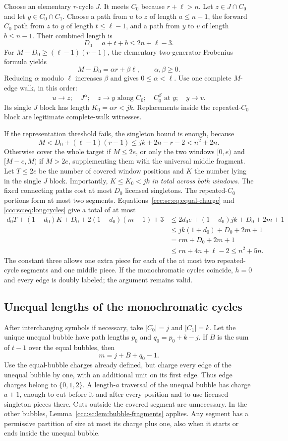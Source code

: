 \documentclass[11pt,letterpaper]{article}
\theoremstyle{definition}
\theoremstyle{remark}
\begin{document}
Choose an elementary $r$-cycle $J$. It meets $C_0$ because $r+\ell>n$. Let $z\in J\cap C_0$ and let $y\in C_0\cap C_1$. Choose a path from $u$ to $z$ of length $a\le n-1$, the forward $C_0$ path from $z$ to $y$ of length $t\le\ell-1$, and a path from $y$ to $v$ of length $b\le n-1$. Their combined length is
\[
 D_0=a+t+b\le2n+\ell-3.
\]
For $M-D_0\ge(\ell-1)(r-1)$, the elementary two-generator Frobenius formula yields
\[
 M-D_0=\alpha r+\beta\ell,\qquad \alpha,\beta\ge0.
\]
Reducing $\alpha$ modulo $\ell$ increases $\beta$ and gives $0\le\alpha<\ell$. Use one complete $M$-edge walk, in this order:
\[
 u\to z;\quad J^{\alpha};\quad z\to y\text{ along }C_0;
 \quad C_0^{\beta}\text{ at }y;\quad y\to v.
\]
Its single $J$ block has length $K_0=\alpha r<jk$. Replacements inside the repeated-$C_0$ block are legitimate complete-walk witnesses.

If the representation threshold fails, the singleton bound is enough, because
\[
 M<D_0+(\ell-1)(r-1)\le jk+2n-r-2<n^2+2n.
\]
Otherwise cover the whole target if $M\le2e$, or only the two windows $[0,e)$ and $[M-e,M)$ if $M>2e$, supplementing them with the universal middle fragment. Let $T\le2e$ be the number of covered window positions and $K$ the number lying in the single $J$ block. Importantly, $K\le K_0<jk$ \emph{in total across both windows}. The fixed connecting paths cost at most $D_0$ licensed singletons. The repeated-$C_0$ portions form at most two segments. Equations~\eqref{ccc:sc:eq:equal-charge} and \eqref{ccc:sc:eq:longcycles} give a total of at most
\begin{align*}
 d_0T+(1-d_0)K+D_0+2(1-d_0)(m-1)+3
 &\le 2d_0 e+(1-d_0)jk+D_0+2m+1\\
 &\le jk(1+d_0)+D_0+2m+1\\
 &=rm+D_0+2m+1\\
 &\le rn+4n+\ell-2\le n^2+5n.
\end{align*}
The constant three allows one extra piece for each of the at most two repeated-cycle segments and one middle piece. If the monochromatic cycles coincide, $h=0$ and every edge is doubly labeled; the argument remains valid.

\subsection{Unequal lengths of the monochromatic cycles}

After interchanging symbols if necessary, take $|C_0|=j$ and $|C_1|=k$. Let the unique unequal bubble have path lengths $p_0$ and $q_0=p_0+k-j$. If $B$ is the sum of $t-1$ over the equal bubbles, then
\[
 m=j+B+q_0-1.
\]
Use the equal-bubble charges already defined, but charge every edge of the unequal bubble by one, with an additional unit on its first edge. Thus edge charges belong to $\{0,1,2\}$. A length-$a$ traversal of the unequal bubble has charge $a+1$, enough to cut before it and after every position and to use licensed singleton pieces there. Cuts outside the covered segment are unnecessary. In the other bubbles, Lemma~\ref{ccc:sc:lem:bubble-fragments} applies. Any segment has a permissive partition of size at most its charge plus one, also when it starts or ends inside the unequal bubble.
\end{document}
